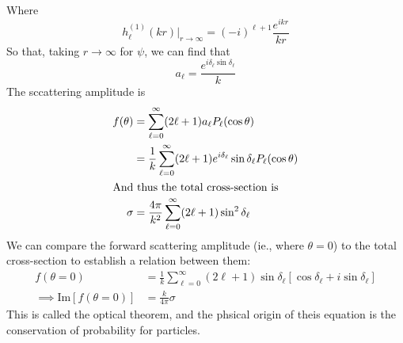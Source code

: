 \documentclass[a4paper]{article}
\begin{document}
Where
\[
	h_\ell^{(1)}(kr)\rvert_{r\to\infty} = (-i)^{\ell+1}
	\frac{e^{ikr}}{kr}
\]
So that, taking $r\to\infty$ for $\psi$, we can find that
\[
	a_\ell = \frac{e^{i\delta_\ell\sin\delta_\ell}}{k}
\]
The sccattering amplitude is
\begin{align*}
	f(\theta) &= \sum_{\ell=0}^\infty (2\ell+1) a_\ell P_\ell(\cos\theta)\\
	&= \frac{1}{k} \sum_{\ell=0}^\infty
	(2\ell+1)e^{i\delta_\ell}\sin\delta_\ell P_\ell(\cos\theta)\\
\intertext{And thus the total cross-section is}
	\sigma &= \frac{4\pi}{k^2}\sum_{\ell=0}^\infty
	(2\ell+1)\sin^2\delta_\ell
\end{align*}
We can compare the forward scattering amplitude (ie., where $\theta=0$) to the
total cross-section to establish a relation between them:
\begin{align*}
	f(\theta=0) &= \frac{1}{k}\sum_{\ell=0}^\infty (2\ell+1)\sin\delta_\ell
	\left[\cos\delta_\ell + i\sin\delta_\ell\right]\\
	\implies \mathrm{Im}[f(\theta=0)] &= \frac{k}{4\pi}\sigma
\end{align*}
This is called the optical theorem, and the phsical origin of theis equation is
the conservation of probability for particles.
\end{document}
